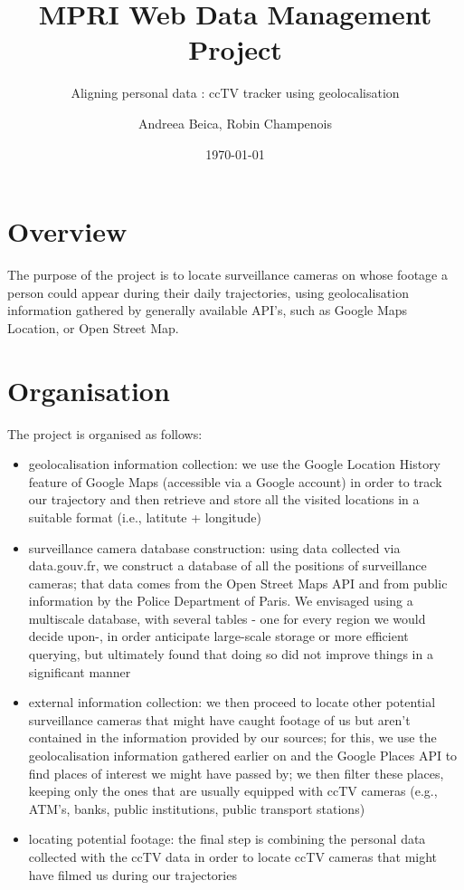 \documentclass[a4paper]{scrartcl}
\title{MPRI Web Data Management Project}
\subtitle{Aligning personal data : ccTV tracker using geolocalisation}
\author{Andreea Beica, Robin Champenois}
\date{\today}
\begin{document}
\maketitle

\section{Overview}
The purpose of the project is to locate surveillance cameras on whose footage a person could appear during their daily trajectories, using geolocalisation information gathered by generally available API's, such as Google Maps Location, or Open Street Map.

\section{Organisation}

The project is organised as follows:

\begin{itemize}
\item geolocalisation information collection: we use the Google Location History feature of Google Maps (accessible via a Google account) in order to track our trajectory and then retrieve and store all the visited locations in a suitable format (i.e., latitute + longitude)
\item surveillance camera database construction: using data collected via data.gouv.fr, we construct a database of all the positions of surveillance cameras; that data comes from the Open Street Maps API and from public information by the Police Department of Paris. We envisaged using a multiscale database, with several tables - one for every region we would decide upon-, in order anticipate large-scale storage or more efficient querying, but ultimately found that doing so did not improve things in a significant manner
\item external information collection: we then proceed to locate other potential surveillance cameras that might have caught footage of us but aren't contained in the information provided by our sources; for this, we use the geolocalisation information gathered earlier on and the Google Places API to find places of interest we might have passed by; we then filter these places, keeping only the ones that are usually equipped with ccTV cameras (e.g., ATM's, banks, public institutions, public transport stations)
\item locating potential footage: the final step is combining the personal data collected with the ccTV data in order to locate ccTV cameras that might have filmed us during our trajectories
\end{itemize}
\end{document}
